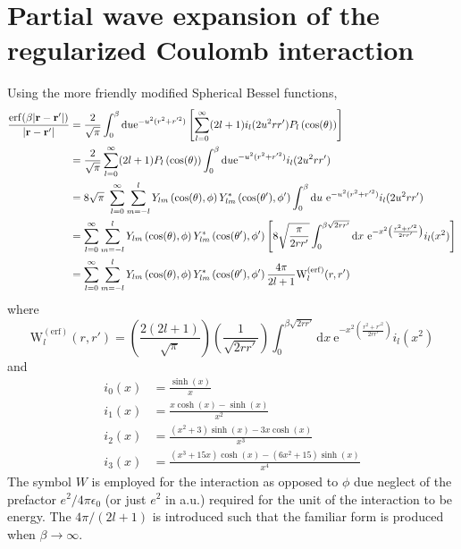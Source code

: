 \documentclass[paper=a4, fontsize=11pt]{article} %
\numberwithin{equation}{section} %
\numberwithin{figure}{section} %
\numberwithin{table}{section} %
\newcommand{\br}{{\bf{r}}}
\newcommand{\re}{{\mathrm{e}}}
\newcommand{\rerf}{{\mathrm{erf}}}
\newcommand{\rd}{{\mathrm{d}}}
\newcommand{\PWerf}{\mathrm{W}^{(\mathrm{erf})}}
\begin{document}
\section{Partial wave expansion of the regularized Coulomb interaction}

Using the more friendly modified Spherical Bessel functions,
\begin{equation}
\begin{split}
\frac{\rerf(\beta|\br-\br'|)}{|\br-\br'|}
&= \frac{2}{\sqrt{\pi}}\int_0^\beta \rd u \re^{-u^2(r^2 + r'^2)}
    \left [\sum_{l=0}^\infty (2l+1) i_{l}(2u^2 r r')P_l\left(\cos(\theta)\right)\right ] \\
&= \frac{2}{\sqrt{\pi}}\sum_{l=0}^\infty (2l+1)P_l\left(\cos(\theta)\right)
      \int_0^\beta \rd u \re^{-u^2(r^2 + r'^2)}i_{l}(2u^2 r r') \\
&= 8\sqrt{\pi}\
      \sum_{l=0}^\infty \sum_{m=-l}^{l} Y_{lm}\left(\cos(\theta),\phi\right)Y_{lm}^*\left(\cos(\theta'),\phi'\right)
      \int_0^\beta \rd u\ \re^{-u^2(r^2 + r'^2)}i_{l}(2u^2 r r') \\
&= \sum_{l=0}^\infty \sum_{m=-l}^{l} Y_{lm}\left(\cos(\theta),\phi\right)Y_{lm}^*\left(\cos(\theta'),\phi'\right)
  \left [ 8 \sqrt{\frac{\pi}{2rr'}}
          \int_0^{\beta\sqrt{2rr'}}\rd x\ \re^{-x^2\left(\frac{r^2 + r'^2}{2rr'}\right)}i_{l}(x^2)
  \right]  \\
&=  \sum_{l=0}^\infty \sum_{m=-l}^{l} Y_{lm}\left(\cos(\theta),\phi\right)Y_{lm}^*\left(\cos(\theta'),\phi'\right)
    \frac{4\pi}{2l+1}\PWerf_l(r,r')
\end{split}
\end{equation}
where
\begin{equation}
\PWerf_l(r,r') = \left(\frac{2(2l+1)}{\sqrt{\pi}}\right)\left(\frac{1}{\sqrt{2rr'}}\right)
      \int_0^{\beta\sqrt{2rr'}}\rd x\ \re^{-x^2\left(\frac{r^2 + r'^2}{2rr'}\right)}i_{l}(x^2)
\end{equation}
and
\begin{equation}
\begin{split}
i_0(x) &= \frac{\sinh(x)}{x} \\
i_1(x) &= \frac{x\cosh(x)-\sinh(x)}{x^2} \\
i_2(x) &= \frac{(x^2+3)\sinh(x)-3x\cosh(x)}{x^3} \\
i_3(x) &= \frac{(x^3+15x)\cosh(x)-(6x^2+15)\sinh(x)}{x^4}
\end{split}
\end{equation}
The symbol $W$ is employed for the interaction as opposed to $\phi$ due neglect of the
prefactor $e^2/4\pi \epsilon_0$ (or just $e^2$ in a.u.) required for the unit of the interaction to be energy.
The $4\pi/(2l+1)$ is introduced such that the familiar form is produced when $\beta \rightarrow \infty$.
\end{document}
